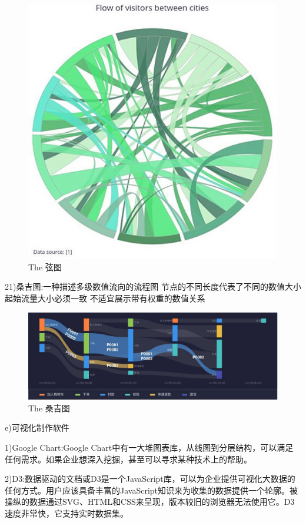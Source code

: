 \documentclass{article}
\begin{document}
\begin{itemize}
\begin{figure}[h!]
    			\centering
    			\includegraphics[scale=0.4]{xian}
    			\caption{The 弦图}
    			\label{fig:xian}
    		\end{figure}
    		21)桑吉图:一种描述多级数值流向的流程图
    		节点的不同长度代表了不同的数值大小
    		起始流量大小必须一致
    		不适宜展示带有权重的数值关系\par
    		\begin{figure}[h!]
    			\centering
    			\includegraphics[scale=0.7]{sang}
    			\caption{The 桑吉图}
    			\label{fig:sang}
    		\end{figure}
    	e)可视化制作软件\par
    		1)Google Chart:Google Chart中有一大堆图表库，从线图到分层结构，可以满足任何需求。如果企业想深入挖掘，甚至可以寻求某种技术上的帮助。\par
    		2)D3:数据驱动的文档或D3是一个JavaScript库，可以为企业提供可视化大数据的任何方式。用户应该具备丰富的JavaScript知识来为收集的数据提供一个轮廓。被操纵的数据通过SVG、HTML和CSS来呈现，版本较旧的浏览器无法使用它。D3速度非常快，它支持实时数据集。\par

\end{itemize}
\end{document}
